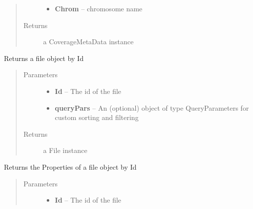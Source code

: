 \documentclass[letterpaper,10pt,english]{sphinxmanual}
\begin{document}
\begin{fulllineitems}
\begin{fulllineitems}
\begin{quote}
\begin{description}
\begin{itemize}
\item {} 
\textbf{Chrom} -- chromosome name

\end{itemize}

\item[{Returns}] \leavevmode
a CoverageMetaData instance

\end{description}\end{quote}

\end{fulllineitems}


\begin{fulllineitems}
\label{Available modules:BaseSpacePy.api.BaseSpaceAPI.BaseSpaceAPI.getFileById}
Returns a file object by Id
\begin{quote}\begin{description}
\item[{Parameters}] \leavevmode\begin{itemize}
\item {} 
\textbf{Id} -- The id of the file

\item {} 
\textbf{queryPars} -- An (optional) object of type QueryParameters for custom sorting and filtering

\end{itemize}

\item[{Returns}] \leavevmode
a File instance

\end{description}\end{quote}

\end{fulllineitems}


\begin{fulllineitems}
\label{Available modules:BaseSpacePy.api.BaseSpaceAPI.BaseSpaceAPI.getFilePropertiesById}
Returns the Properties of a file object by Id
\begin{quote}\begin{description}
\item[{Parameters}] \leavevmode\begin{itemize}
\item {} 
\textbf{Id} -- The id of the file


\end{itemize}
\end{description}
\end{quote}
\end{fulllineitems}
\end{fulllineitems}
\end{document}
